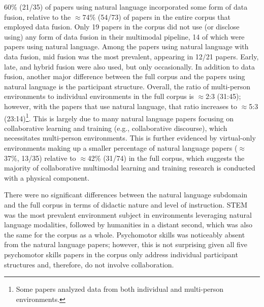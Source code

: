 \documentclass[manuscript,screen,review]{acmart}
\begin{document}
60\% (21/35) of papers using natural language incorporated some form of data fusion, relative to the $\approx$74\% (54/73) of papers in the entire corpus that employed data fusion. Only 19 papers in the corpus did not use (or disclose using) any form of data fusion in their multimodal pipeline, 14 of which were papers using natural language. Among the papers using natural language with data fusion, mid fusion was the most prevalent, appearing in 12/21 papers. Early, late, and hybrid fusion were also used, but only occasionally. In addition to data fusion, another major difference between the full corpus and the papers using natural language is the participant structure. Overall, the ratio of multi-person environments to individual environments in the full corpus is $\approx$2:3 (31:45); however, with the papers that use natural language, that ratio increases to $\approx$5:3 (23:14)\footnote{Some papers analyzed data from both individual and multi-person environments.}. This is largely due to many natural language papers focusing on collaborative learning and training (e.g., collaborative discourse), which necessitates multi-person environments. This is further evidenced by virtual-only environments making up a smaller percentage of natural language papers ($\approx$37\%, 13/35) relative to $\approx$42\% (31/74) in the full corpus, which suggests the majority of collaborative multimodal learning and training research is conducted with a physical component. 

There were no significant differences between the natural language subdomain and the full corpus in terms of didactic nature and level of instruction. STEM was the most prevalent environment subject in environments leveraging natural language modalities, followed by humanities in a distant second, which was also the same for the corpus as a whole. Psychomotor skills was noticeably absent from the natural language papers; however, this is not surprising given all five psychomotor skills papers in the corpus only address individual participant structures and, therefore, do not involve collaboration.
\end{document}
